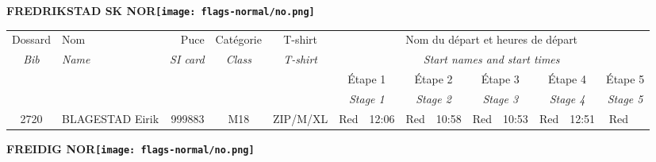 \documentclass{report}
\begin{document}
\newpage
  \Huge \centering \bfseries FREDRIKSTAD SK  NOR\normalfont \footnotesize \sffamily \hfill \texttt{[image: flags-normal/no.png]} \newline 
  \begin{longtable}{|c|l|r|c|c|*{5}{cc|}}
    Dossard & Nom  & Puce    & Catégorie & T-shirt & \multicolumn{10}{c|}{Nom du départ et heures de départ} \\
    \itshape Bib     & \itshape Name & \itshape SI card & \itshape Class  & \itshape  T-shirt  & \multicolumn{10}{c|}{\itshape Start names and start times} \\
    \hline
    & & & & & \multicolumn{2}{c|}{Étape 1} & \multicolumn{2}{c|}{Étape 2} & \multicolumn{2}{c|}{Étape 3} & \multicolumn{2}{c|}{Étape 4} & \multicolumn{2}{c|}{Étape 5} \\
    & & & & & \multicolumn{2}{c|}{\itshape Stage 1} & \multicolumn{2}{c|}{\itshape Stage 2} & \multicolumn{2}{c|}{\itshape Stage 3} & \multicolumn{2}{c|}{\itshape Stage 4} & \multicolumn{2}{c|}{\itshape Stage 5} \\
    \hline
    2720 & BLAGESTAD Eirik & 999883 & M18 & ZIP/M/XL & Red & 12:06 & Red & 10:58 & Red & 10:53 & Red & 12:51 & Red &  \\
  \end{longtable}
\newpage
  \Huge \centering \bfseries FREIDIG  NOR\normalfont \footnotesize \sffamily \hfill \texttt{[image: flags-normal/no.png]} \newline 
\end{document}
